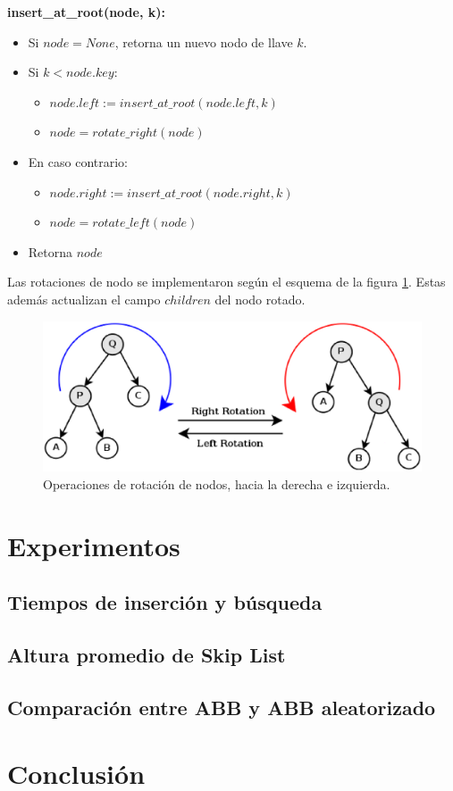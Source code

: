 \documentclass[12pt,letterpaper]{article}
\begin{document}
\textbf{insert\_at\_root(node, k):}
\begin{itemize}
\item	Si $node = None$, retorna un nuevo nodo de llave $k$.
\item	Si $k < node.key$:
	\begin{itemize}
	\item	$node.left := insert\_at\_root(node.left, k)$
	\item	$node = rotate\_right(node)$
	\end{itemize}
\item	En caso contrario:
	\begin{itemize}
	\item	$node.right := insert\_at\_root(node.right, k)$
	\item	$node = rotate\_left(node)$
	\end{itemize}
\item	Retorna $node$
\end{itemize}

Las rotaciones de nodo se implementaron según el esquema de la figura \ref{fig:rotaciones}. Estas además actualizan el campo $children$ del nodo rotado.

\begin{figure}[ht]
\centering
\includegraphics[scale=0.7]{rotations.eps}
\caption{Operaciones de rotación de nodos, hacia la derecha e izquierda.}
\label{fig:rotaciones}
\end{figure}

\section{Experimentos}
\subsection{Tiempos de inserción y búsqueda}
\subsection{Altura promedio de Skip List}
\subsection{Comparación entre ABB y ABB aleatorizado}
\section{Conclusión}


\end{document}
